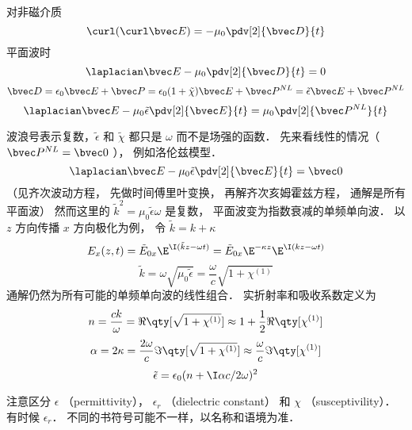 
对非磁介质
\begin{equation}
\curl (\curl \bvec E) = -\mu_0 \pdv[2]{\bvec D}{t}
\end{equation}
平面波时
\begin{equation}
\laplacian \bvec E - \mu_0 \pdv[2]{\bvec D}{t} = 0
\end{equation}
\begin{equation}
\bvec D = \epsilon_0 \bvec E + \bvec P = \epsilon_0(1 + \tilde\chi)\bvec E + \bvec P^{NL} = \tilde \epsilon \bvec E + \bvec P^{NL}
\end{equation}
\begin{equation}
\laplacian\bvec E - \mu_0\tilde\epsilon \pdv[2]{\bvec E}{t} = \mu_0 \pdv[2]{\bvec P^{NL}}{t}
\end{equation}
 
波浪号表示复数，$\tilde\epsilon$ 和 $\tilde\chi$ 都只是 $\omega$ 而不是场强的函数． 先来看线性的情况（ $\bvec P^{NL} = \bvec 0$ ）， 例如洛伦兹模型．
\begin{equation}
\laplacian\bvec E - \mu_0 \tilde\epsilon \pdv[2]{\bvec E}{t} = \bvec 0
\end{equation}
（见齐次波动方程， 先做时间傅里叶变换， 再解齐次亥姆霍兹方程， 通解是所有平面波） 然而这里的 $\tilde k^2 = \mu_0 \tilde \epsilon \omega$ 是复数， 平面波变为指数衰减的单频单向波． 以 $z$ 方向传播 $x$ 方向极化为例， 令  $\tilde k = k + \kappa$
\begin{equation}
E_x(z,t) = \tilde E_{0x} \E^{\I(\tilde kz - \omega t)} = \tilde E_{0x} \E^{-\kappa z} \E^{\I(kz - \omega t)}
\end{equation}
\begin{equation}
\tilde k = \omega \sqrt{\mu_0\tilde\epsilon} = \frac{\omega }{c}\sqrt {1 + \chi ^{(1)}}
\end{equation}
通解仍然为所有可能的单频单向波的线性组合． 实折射率和吸收系数定义为
\begin{equation}
n = \frac{ck}{\omega } = \Re\qty[\sqrt{1 + \chi ^{(1)}}] \approx 1 + \frac12 \Re\qty[\chi^{(1)}]
\end{equation}
\begin{equation}
\alpha  = 2\kappa  = \frac{2\omega}{c} \Im\qty[\sqrt{1+\chi^{(1)}}] \approx \frac{\omega}{c}\Im\qty[\chi ^{(1)}]
\end{equation}
\begin{equation}
\tilde \epsilon  = \epsilon_0 (n + \I \alpha c/2\omega )^2
\end{equation}
 
注意区分 $\epsilon$ （permittivity）， $\epsilon_r$ （dielectric constant） 和 $\chi$ （susceptivility）． 有时候 $\epsilon_r$． %
不同的书符号可能不一样，以名称和语境为准．

